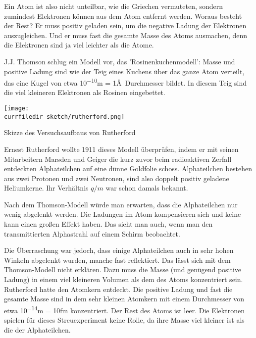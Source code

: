 Ein Atom ist also nicht unteilbar, wie die Griechen vermuteten, sondern zumindest Elektronen können aus dem Atom entfernt werden. Woraus besteht der Rest? Er muss positiv geladen sein, um die negative Ladung der Elektronen auszugleichen. Und er muss fast die gesamte Masse des Atoms ausmachen, denn die Elektronen sind ja viel leichter als die Atome.

J.J. Thomson schlug ein Modell vor, das 'Rosinenkuchenmodell': Masse und positive Ladung sind wie der Teig eines Kuchens über das ganze Atom verteilt, das eine Kugel von etwa \si{10^{-10}}{m} = 1\AA\ Durchmesser bildet. In diesem Teig sind die viel kleineren Elektronen als Rosinen eingebettet.



\begin{marginfigure}
    \texttt{[image: \\currfiledir  sketch/rutherford.png]}
    \caption{Skizze des Versuchsaufbaus von Rutherford}
\end{marginfigure}

Ernest Rutherford wollte 1911 dieses Modell überprüfen, indem er mit seinen Mitarbeitern Marsden und Geiger die kurz zuvor beim radioaktiven Zerfall entdeckten Alphateilchen auf eine dünne Goldfolie schoss. Alphateilchen bestehen aus zwei Protonen und zwei Neutronen, sind also doppelt positiv geladene Heliumkerne. Ihr Verhältnis $q/m$ war schon damals bekannt.

Nach dem Thomson-Modell würde man erwarten, dass die Alphateilchen nur wenig abgelenkt werden. Die Ladungen im Atom kompensieren sich und keine kann einen großen Effekt haben. Das sieht man auch, wenn man den transmittierten Alphastrahl auf einem Schirm beobachtet.



Die Überraschung war jedoch, dass einige Alphateilchen auch in sehr hohen Winkeln abgelenkt wurden, manche fast reflektiert. Das lässt sich mit dem Thomson-Modell nicht erklären. Dazu muss die Masse (und genügend positive Ladung) in einem viel kleineren Volumen als dem des Atoms konzentriert sein. Rutherford hatte den Atomkern entdeckt. Die positive Ladung und fast die gesamte Masse sind in dem sehr kleinen Atomkern mit einem Durchmesser von etwa \si{10^{-14}}{m} = \si{10}{fm} konzentriert. Der Rest des Atoms ist leer. Die Elektronen spielen für dieses Streuexperiment keine Rolle, da ihre Masse viel kleiner ist als die der Alphateilchen.

